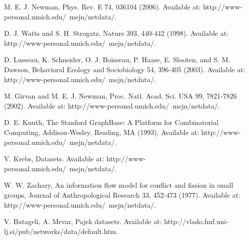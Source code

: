 \documentclass{llncs}
\begin{document}
%

%
%
\begin{thebibliography}{}
%
%
%
%
%

M. E. J. Newman, Phys. Rev. E 74, 036104 (2006). Available at: http://www-personal.umich.edu/~mejn/netdata/.

D. J. Watts and S. H. Strogatz, Nature 393, 440-442 (1998). Available at: http://www-personal.umich.edu/~mejn/netdata/.

D. Lusseau, K. Schneider, O. J. Boisseau, P. Haase, E. Slooten, and S. M. Dawson, Behavioral Ecology and Sociobiology 54, 396-405 (2003). Available at: http://www-personal.umich.edu/~mejn/netdata/.

M. Girvan and M. E. J. Newman, Proc. Natl. Acad. Sci. USA 99, 7821-7826 (2002). Available at: http://www-personal.umich.edu/~mejn/netdata/.

D. E. Knuth, The Stanford GraphBase: A Platform for Combinatorial Computing, Addison-Wesley, Reading, MA (1993). Available at: http://www-personal.umich.edu/~mejn/netdata/.

V. Krebs, Datasets. Available at: http://www-personal.umich.edu/~mejn/netdata/.

W. W. Zachary, An information flow model for conflict and fission in small groups, Journal of Anthropological Research 33, 452-473 (1977). Available at: http://www-personal.umich.edu/~mejn/netdata/.

V. Batageli, A. Mrvar, Pajek datasets. Available at: http://vlado.fmf.uni-lj.si/pub/networks/data/default.htm.

\end{thebibliography}
\end{document}
